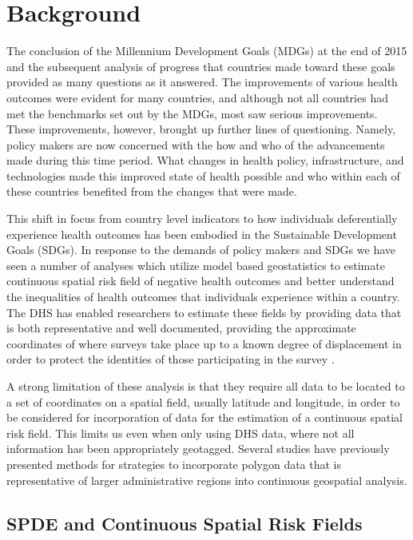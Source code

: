\documentclass{article}
\begin{document}
\section{Background}\label{background}

The conclusion of the Millennium Development Goals (MDGs) at the end of 2015 and the subsequent analysis of progress that countries made toward these goals provided as many questions as it answered. The improvements of various health outcomes were evident for many countries, and although not all countries had met the benchmarks set out by the MDGs, most saw serious improvements. These improvements, however, brought up further lines of questioning. Namely, policy makers are now concerned with the how and who of the advancements made during this time period. What changes in health policy, infrastructure, and technologies made this improved state of health possible and who within each of these countries benefited from the changes that were made. 

This shift in focus from country level indicators to how individuals deferentially experience health outcomes has been embodied in the Sustainable Development Goals (SDGs). In response to the demands of policy makers and SDGs we have seen a number of analyses which utilize model based geostatistics to estimate continuous spatial risk field of negative health outcomes and better understand the inequalities of health outcomes that individuals experience within a country. The DHS has enabled researchers to estimate these fields by providing data that is both representative and well documented, providing the approximate coordinates of where surveys take place up to a known degree of displacement in order to protect the identities of those participating in the survey \cite{Burgert-Brucker2016, Gething2015}. 

A strong limitation of these analysis is that they require all data to be located to a set of coordinates on a spatial field, usually latitude and longitude, in order to be considered for incorporation of data for the estimation of a continuous spatial risk field. This limits us even when only using DHS data, where not all information has been appropriately geotagged. Several studies have previously presented methods for strategies to incorporate polygon data that is representative of larger administrative regions into continuous geospatial analysis.

\subsection{SPDE and Continuous Spatial Risk Fields}
\end{document}
